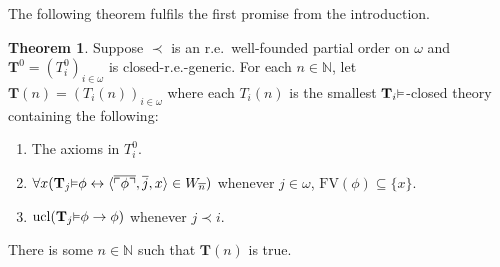 \documentclass[reqno]{article}
\theoremstyle{definition}
\newtheorem{theorem}{Theorem}
\def\N{\mathbb{N}}
\def\T{\mathbf{T}}
\def\FV{\mathrm{FV}}
\renewcommand{\Pr}[1]{\T_{#1}\mbox{\small${\vDash}$}}
\newcommand{\ucl}[1]{\mathrm{ucl}(#1)}
\begin{document}
The following theorem fulfils the first promise from the introduction.


\begin{theorem}
\label{onethreethree}
Suppose $\prec$ is an r.e.~well-founded
partial order on $\omega$
and $\T^0=(T^0_i)_{i\in \omega}$ is closed-r.e.-generic.
For each $n\in\N$,
let $\T(n)=(T_i(n))_{i\in \omega}$
where each $T_i(n)$ is the smallest $\Pr i$-closed theory
containing the following:
\begin{enumerate}
\item The axioms in $T^0_i$.
\item $\forall x(\Pr j\phi\leftrightarrow\langle\overline{\ulcorner\phi\urcorner},\overline j,x\rangle\in W_{\overline n})$
whenever $j\in\omega$, 
$\FV(\phi)\subseteq\{x\}$.
\item $\ucl{\Pr j\phi\rightarrow\phi}$ whenever $j\prec i$.
\end{enumerate}
There is some $n\in\N$ such that $\T(n)$ is true.
\end{theorem}
\end{document}
